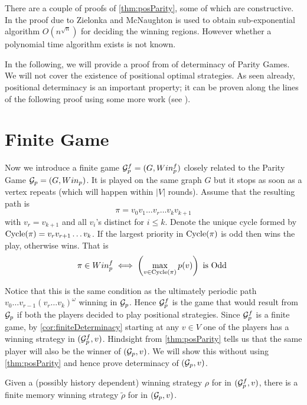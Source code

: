 There are a couple of proofs of \autoref{thm:posParity}, some of which are constructive. In \cite{subexp} the proof due to Zielonka \cite{zielonka_infinite_1998} and McNaughton \cite{mcnaughton_infinite_1993} is used to obtain sub-exponential algorithm $O(n^{\sqrt{n}})$ for deciding the winning regions. However whether a polynomial time algorithm exists is not known. 

In the following, we will provide a proof from \cite{bjorklund_memoryless_2004} of determinacy of Parity Games. We will not cover the existence of positional optimal strategies. As seen already, positional determinacy is an important property; it can be proven along the lines of the following proof using some more work (see \cite{bjorklund_memoryless_2004}).

\section{Finite Game}
\label{sec:parityFiniteGame}

Now we introduce a finite game $\mathcal{G}^f_p=(G,Win^f_p)$ closely related to the Parity Game $\mathcal{G}_p=(G,Win_p)$. It is played on the same graph $G$ but it stops as soon as a vertex repeats (which will happen within $|V|$ rounds). Assume that the resulting path is 
\[
    \pi = v_0v_1 \ldots v_r \ldots v_k v_{k+1}
\] 
with $v_r = v_{k+1}$ and all $v_i$'s distinct for $i \leq k$. Denote the unique cycle formed by $\operatorname{Cycle}(\pi)=v_r v_{r+1} \ldots v_k$. If the largest priority in $\operatorname{Cycle}(\pi)$ is odd then  wins the play, otherwise  wins. That is  
\[
    \pi \in Win^f_p \iff \left(\max_{v \in \operatorname{Cycle}(\pi)} p(v)\right) \text{ is Odd }
\]

Notice that this is the same condition as the ultimately periodic path $v_0 \ldots v_{r-1} (v_r \ldots v_k)^\omega$ winning in $\mathcal{G}_p$. Hence $\mathcal{G}^f_p$ is the game that would result from $\mathcal{G}_p$ if both the players decided to play positional strategies. Since $\mathcal{G}^f_p$ is a finite game, by \autoref{cor:finiteDeterminacy} starting at any $v \in V$ one of the players has a winning strategy in $(\mathcal{G}^f_p, v)$. Hindsight from \autoref{thm:posParity} tells us that the same player will also be the winner of $(\mathcal{G}_p,v)$. We will show this without using \autoref{thm:posParity} and hence prove determinacy of $(\mathcal{G}_p,v)$.\\
\begin{theorem}
    \label{thm:parityDet}
    Given a (possibly history dependent) winning strategy $\rho$ for  in $(\mathcal{G}^f_p,v)$, there is a finite memory winning strategy $\tilde{\rho}$ for  in $(\mathcal{G}_p,v)$.
\end{theorem}

